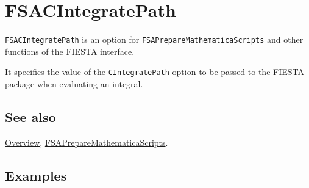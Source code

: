 \documentclass[../FeynHelpersManual.tex]{subfiles}
\begin{document}
\begin{Shaded}
\begin{Highlighting}[]
 
\end{Highlighting}
\end{Shaded}

\hypertarget{fsacintegratepath}{
\section{FSACIntegratePath}\label{fsacintegratepath}}

\texttt{FSACIntegratePath} is an option for
\texttt{FSAPrepareMathematicaScripts} and other functions of the FIESTA
interface.

It specifies the value of the \texttt{CIntegratePath} option to be
passed to the FIESTA package when evaluating an integral.

\subsection{See also}

\hyperlink{toc}{Overview},
\hyperlink{fsapreparemathematicascripts}{FSAPrepareMathematicaScripts}.

\subsection{Examples}
\end{document}
